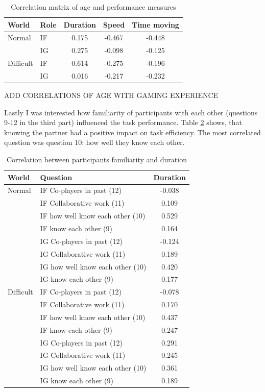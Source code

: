\begin{table}[!htbp]
 \centering
\begin{tabular}{llccc}
\toprule
World & Role  & Duration & Speed & Time moving  \\
\midrule
Normal 	& IF & 0.175 & -0.467 & -0.448\\
 		& IG & 0.275 & -0.098 & -0.125\\
\midrule
Difficult& IF & 0.614 &	-0.275 &-0.196\\
 		& IG  & 0.016 &	-0.217 &-0.232\\
\bottomrule
\end{tabular}
\caption{Correlation matrix of age and performance measures}
\label{tab:demfactors-age}
\end{table}

ADD CORRELATIONS OF AGE WITH GAMING EXPERIENCE

Lastly I was interested how familiarity of participants with each other (questions 9-12 in the third part) influenced the task performance. Table \ref{tab:demfactors-famother} shows, that knowing the partner had a positive impact on task efficiency. The most correlated question was question 10: how well they know each other.

\begin{table}[!htbp]
 \centering
\begin{tabular}{llc}
\toprule
World & Question  & Duration \\
\midrule
Normal 	& IF Co-players in past (12) 	& -0.038\\
 		& IF Collaborative work 	(11)		& 0.109	 \\
 		& IF how well know each other (10)		& 0.529\\
 		& IF know each other (9)			& 0.164	\\
 		& IG Co-players in past (12) 	& -0.124\\
 		& IG Collaborative work 	(11)		& 0.189	 \\
 		& IG how well know each other (10)		& 0.420\\
 		& IG know each other (9)			& 0.177	\\
\midrule
Difficult& IF Co-players in past (12) 	& -0.078\\
 		& IF Collaborative work 	(11)		& 0.170	 \\
  		& IF how well know each other (10)		& 0.437\\
 		& IF know each other (9)			& 0.247	\\
 		& IG Co-players in past (12) 	& 0.291\\
 		& IG Collaborative work 	(11)		& 0.245	 \\
 		& IG how well know each other (10)		& 0.361\\
 		& IG know each other (9)			& 0.189	\\
\bottomrule
\end{tabular}
\caption{Correlation between participants familiarity and duration}
\label{tab:demfactors-famother}
\end{table}

